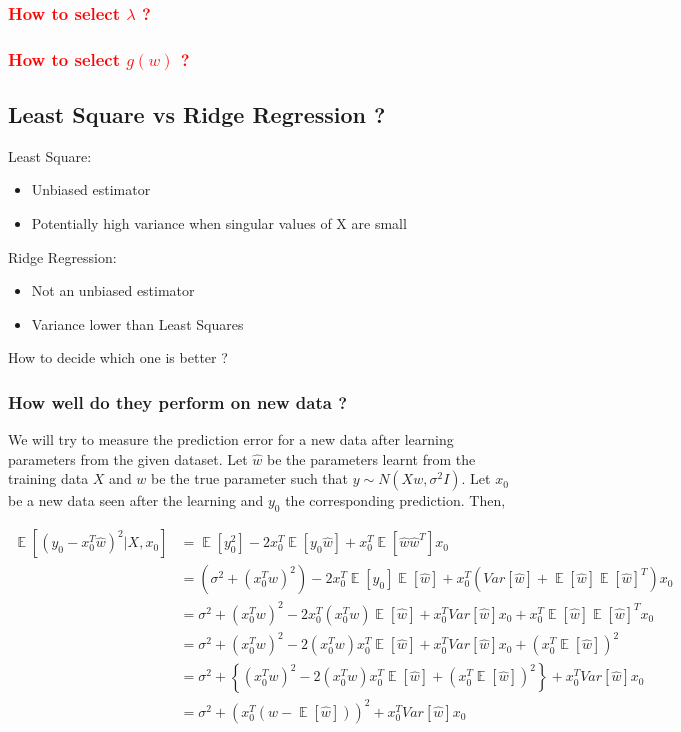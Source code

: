 \documentclass{article}
\DeclareMathOperator*{\E}{\mathop{\mathbb{E}}}
\newcommand{\red}[1]{\textcolor{red}{#1}}
\newcommand{\newpara}{\leavevmode\newline}
\begin{document}
\subsubsection{\red{How to select $\lambda$ ?}}
\subsubsection{\red{How to select $g(w)$ ?}}


\subsection{Least Square vs Ridge Regression ?}

Least Square:
\begin{itemize}
    \item Unbiased estimator
    \item Potentially high variance when singular values of X are small
\end{itemize}
\newpara
Ridge Regression:
\begin{itemize}
    \item Not an unbiased estimator
    \item Variance lower than Least Squares
\end{itemize}
\newpara
How to decide which one is better ?

\subsubsection{How well do they perform on new data ?}
We will try to measure the prediction error for a new data after learning parameters from the given dataset. Let $\hat{w}$ be the parameters learnt from the training data $X$ and $w$ be the true parameter such that $y \sim N(Xw, \sigma^2I)$. Let $x_0$ be a new data seen after the learning and $y_0$ the corresponding prediction. Then,

\begin{align*}
    \E[(y_0-x_0^T\hat{w})^2 \vert X, x_0] &= \E[y_0^2] - 2x_0^T\E[y_0\hat{w}] + x_0^T\E[\hat{w}\hat{w}^T]x_0\\
    &= (\sigma^2 + (x_0^Tw)^2) - 2x_0^T\E[y_0]\E[\hat{w}] + x_0^T (Var[\hat{w}] + \E[\hat{w}]\E[\hat{w}]^T) x_0\\
    &= \sigma^2 + (x_0^Tw)^2 - 2x_0^T (x_0^Tw) \E[\hat{w}] + x_0^T Var[\hat{w}]x_0 + x_0^T \E[\hat{w}]\E[\hat{w}]^T x_0\\
    &= \sigma^2 + (x_0^Tw)^2 - 2(x_0^Tw) x_0^T \E[\hat{w}] + x_0^T Var[\hat{w}]x_0 + (x_0^T \E[\hat{w}])^2\\
    &= \sigma^2 + \left\{ (x_0^Tw)^2 - 2(x_0^Tw) x_0^T \E[\hat{w}] + (x_0^T \E[\hat{w}])^2 \right\} + x_0^T Var[\hat{w}]x_0\\
    &= \sigma^2 + (x_0^T (w - \E[\hat{w}]))^2 + x_0^T Var[\hat{w}]x_0\\   
\end{align*}
\end{document}
